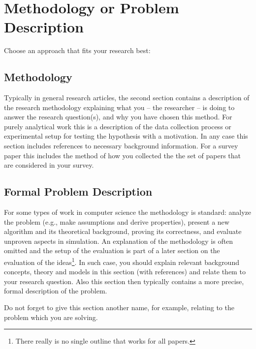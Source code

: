 \section{Methodology or Problem Description}
Choose an approach that fits your research best:
\subsection{Methodology}
Typically in general research articles, the second section contains a description of the research methodology explaining what you -- the researcher -- is doing to answer the research question(s), and why you have chosen this method. For purely analytical work this is a description of the data collection process or experimental setup for testing the hypothesis with a motivation.
In any case this section includes references to necessary background information. For a survey paper this includes the method of how you collected the the set of papers that are considered in your survey.

\subsection{Formal Problem Description}
For some types of work in computer science the methodology is standard: analyze the problem (e.g., make assumptions and derive properties), present a new algorithm and its theoretical background, proving its correctness, and evaluate unproven aspects in simulation. An explanation of the methodology is often omitted and the setup of the evaluation is part of a later section on the evaluation of the ideas\footnote{There really is no single outline that works for all papers.}. In such case, you should explain relevant background concepts, theory and models in this section (with references) and relate them to your research question. Also this section then typically contains a more precise, formal description of the problem.

Do not forget to give this section another name, for example, relating to the problem which you are solving.
